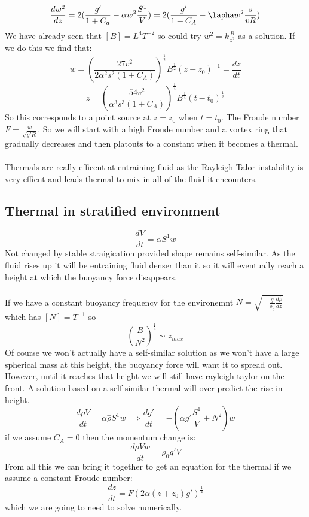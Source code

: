 \documentclass{article}
\begin{document}
$$
 \frac{d w^2}{dz} = 2 ( \frac{g'}{1 + C_a} - \alpha w^2 \frac{S^1}{V}) = 2 ( \frac{g'}{1+ C_A} - \lapha w^2 \frac{s}{vR})
$$
We have already seen that $[B] = L^4 T^{-2}$  so could try $w^2 = k \frac{B}{z^2}$ as a solution. If we do this we find that:
$$
w = ( \frac{27 v^2}{2 \alpha^2 s^2 ( 1+ C_A)})^{\frac{1}{2}} B^{\frac{1}{2}} ( z- z_0)^{-1} = \frac{dz}{dt}
$$
$$
z = ( \frac{ 54 v^2}{\alpha^3 s^3 ( 1+ C_A)})^{\frac{1}{4}} B^{\frac{1}{4}} (t - t_0)^{\frac{1}{2}}
$$
So this corresponds to a point source at $z=z_0$ when $t=t_0$. The Froude number $F= \frac{w}{\sqrt{g' R}} $. So we will start with a high Froude number and a vortex ring that gradually decreases and then platouts to a constant when it becomes a thermal.\\\\
Thermals are really efficent at entraining fluid as the Rayleigh-Talor instability is very effient and leads thermal to mix in all of the fluid it encounters.
\subsection{Thermal in stratified environment}
$$
 \frac{dV}{dt} = \alpha S^1 w
$$
Not changed by stable straigication provided shape remains self-similar. As the fluid rises up it will be entraining fluid denser than it so it will eventually reach a height at which the buoyancy force disappears.\\\\
If we have a constant buoyancy frequency for the environemnt $N = \sqrt{ - \frac{g}{\rho_0} \frac{d \hat \rho}{dz}}$ which has $[N] = T^{-1}$ so 
$$
 ( \frac{B}{N^2})^{\frac{1}{4}} \sim z_{max}
$$
Of course we won't actually have a self-similar solution as we won't have a large spherical mass at this height, the buoyancy force will want it to spread out. However, until it reaches that height we will still have rayleigh-taylor on the front. A solution based on a self-similar thermal will over-predict the rise in height.
$$
 \frac{d \bar \rho V}{dt} = \alpha \hat \rho S^1 w \implies \frac{d g'}{dt} = - ( \alpha g' \frac{S^1}{V} + N^2) w
$$
if we assume $C_A = 0$ then the momentum change is:
$$
 \frac{d \rho V w}{dt} = \rho_0 g' V
$$
From all this we can bring it together to get an equation for the thermal if we assume a constant Froude number:
$$
\frac{dz}{dt} = F ( 2 \alpha ( z+ z_0) g')^{\frac{1}{2}}
$$
which we are going to need to solve numerically.
\end{document}
